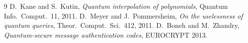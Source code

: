 \documentclass[11pt]{article}
\begin{document}
\begin{thebibliography}{9}
 D.\ Kane and S.\ Kutin, \emph{Quantum interpolation of polynomials},
Quantum Info.\ Comput.\ 11, 2011.
 D.\ Meyer and J.\ Pommersheim, \emph{On the uselessness of quantum queries},
Theor.\ Comput.\ Sci.\ 412, 2011.
 D.\ Boneh and M.\ Zhandry, \emph{Quantum-secure message authentication codes},
EUROCRYPT 2013.
\end{thebibliography}
\end{document}
